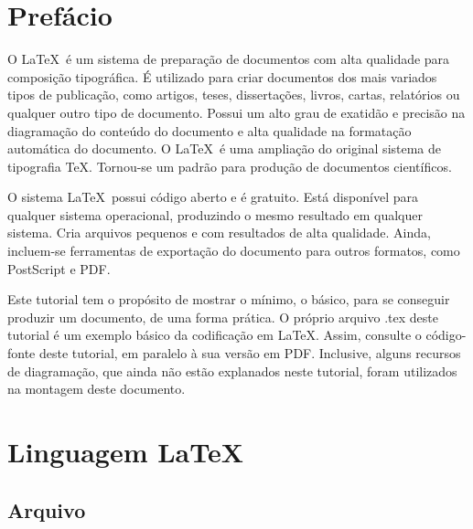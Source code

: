 \documentclass[a4paper,12pt,oneside]{book}
\begin{document}
\frontmatter

\tableofcontents %

\mainmatter


\setlength{\parskip}{1em} %

\chapter*{Prefácio}

O \LaTeX\ é um sistema de preparação de documentos com alta qualidade para composição tipográfica. É utilizado para criar documentos dos mais variados tipos de publicação, como artigos, teses, dissertações, livros, cartas, relatórios ou qualquer outro tipo de documento. Possui um alto grau de exatidão e precisão na diagramação do conteúdo do documento e alta qualidade na formatação automática do documento. O \LaTeX\ é uma ampliação do original sistema de tipografia \TeX. Tornou-se um padrão para produção de documentos científicos.

O sistema \LaTeX\ possui código aberto e é gratuito. Está disponível para qualquer sistema operacional, produzindo o mesmo resultado em qualquer sistema. Cria arquivos pequenos e com resultados de alta qualidade. Ainda, incluem-se ferramentas de exportação do documento para outros formatos, como PostScript e PDF.

Este tutorial tem o propósito de mostrar o mínimo, o básico, para se conseguir produzir um documento, de uma forma prática. O próprio arquivo .tex deste tutorial é um exemplo básico da codificação em \LaTeX. Assim, consulte o código-fonte deste tutorial, em paralelo à sua versão em PDF. Inclusive, alguns recursos de diagramação, que ainda não estão explanados neste tutorial, foram utilizados na montagem deste documento.

\chapter*{Linguagem \LaTeX}

\section*{Arquivo}
\end{document}
